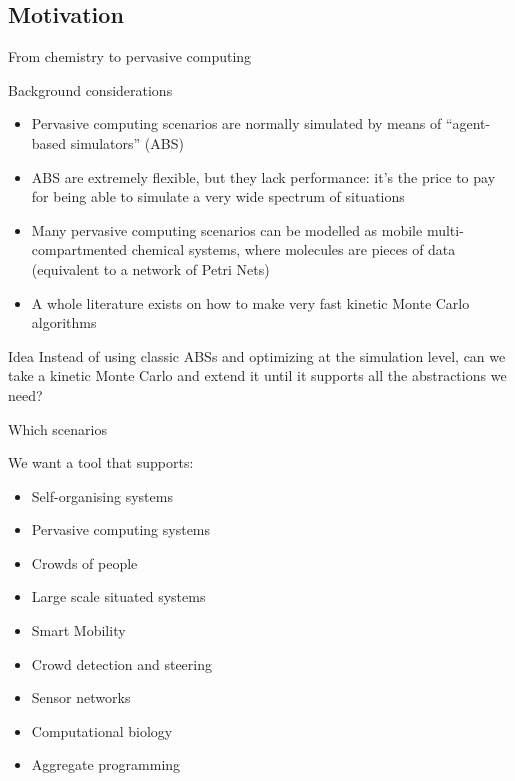 \documentclass[presentation]{beamer}
\begin{document}
\subsection{Motivation}
\begin{frame}{From chemistry to pervasive computing}
 \begin{block}{Background considerations}
  \begin{itemize}
   \item Pervasive computing scenarios are normally simulated by means of ``agent-based simulators'' (ABS) \cite{wooldridge-intelligentagents}
   \item ABS are extremely flexible, but they lack performance: it's the price to pay for being able to simulate a very wide spectrum of situations
   \item Many pervasive computing scenarios can be modelled as mobile multi-compartmented chemical systems, where molecules are pieces of data (equivalent to a network of Petri Nets)
   \item A whole literature exists on how to make very fast kinetic Monte Carlo algorithms
  \end{itemize}
 \end{block}
 \begin{block}{Idea}
  Instead of using classic ABSs and optimizing at the simulation level,
  can we take a kinetic Monte Carlo and extend it until it supports all the abstractions we need?
 \end{block}
\end{frame}

\begin{frame}{Which scenarios}
 \begin{block}{We want a tool that supports:}
  \begin{itemize}
   \item Self-organising systems
   \item Pervasive computing systems
   \item Crowds of people
   \item Large scale situated systems
   \item Smart Mobility
   \item Crowd detection and steering
   \item Sensor networks
   \item Computational biology
   \item Aggregate programming
  \end{itemize}
 \end{block}
\end{frame}
\end{document}
